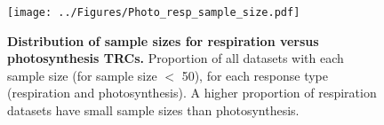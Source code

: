 \documentclass[11pt, a4paper]{article}
\begin{document}
\begin{figure} [H]
	\texttt{[image: ../Figures/Photo\_resp\_sample\_size.pdf]}
	\caption{\label{fig:photo_resp_ss} \textbf{Distribution of sample sizes for respiration versus photosynthesis TRCs.} Proportion of all datasets with each sample size (for sample size $<$ 50), for each response type (respiration and photosynthesis). A higher proportion of respiration datasets have small sample sizes than photosynthesis.}
\end{figure}
\end{document}
